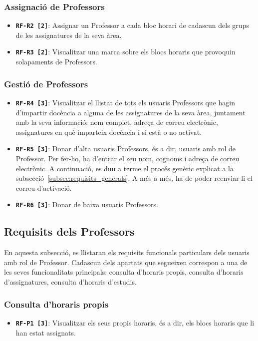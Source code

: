 \documentclass[a4paper,12pt]{ThesisStyle}
\begin{document}
\subsubsection{Assignació de Professors}
\begin{itemize}
  \item \texttt{\textbf{RF-R2 [2]}}: Assignar un Professor a cada bloc horari de cadascun dels grups de les assignatures de la seva àrea.
  \item \texttt{\textbf{RF-R3 [2]}}: Visualitzar una marca sobre els blocs horaris que provoquin solapaments de Professors.
\end{itemize}

\subsubsection{Gestió de Professors}
\begin{itemize}
  \item \texttt{\textbf{RF-R4 [3]}}: Visualitzar el llistat de tots els usuaris Professors que hagin d'impartir docència a alguna de les assignatures de la seva àrea, juntament amb la seva informació: nom complet, adreça de correu electrònic, assignatures en què imparteix docència i si està o no activat.
  \item \texttt{\textbf{RF-R5 [3]}}: Donar d'alta usuaris Professors, és a dir, usuaris amb rol de Professor. Per fer-ho, ha d'entrar el seu nom, cognoms i adreça de correu electrònic. A continuació, es duu a terme el procés genèric explicat a la subsecció~\ref{subsec:requisits_generals}. A més a més, ha de poder reenviar-li el correu d'activació.
  \item \texttt{\textbf{RF-R6 [3]}}: Donar de baixa usuaris Professors.
\end{itemize}

\subsection{Requisits dels Professors}
\label{subsec:requisits_professors}

En aquesta subsecció, es llistaran els requisits funcionals particulars dels usuaris amb rol de Professor. Cadascun dels apartats que segueixen correspon a una de les seves funcionalitats principals: consulta d'horaris propis, consulta d'horaris d'assignatures, consulta d'horaris d'estudis.

\subsubsection{Consulta d'horaris propis}
\begin{itemize}
  \item \texttt{\textbf{RF-P1 [3]}}: Visualitzar els seus propis horaris, és a dir, els blocs horaris que li han estat assignats.
\end{itemize}
\end{document}
